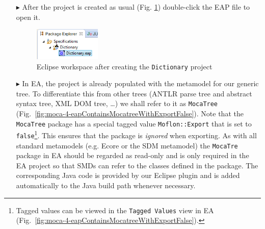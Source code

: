 \begin{enumerate}
\clearpage

\item[$\blacktriangleright$] After the project is created as usual (Fig. \ref{fig:moca-3-WizardResult}) double-click the EAP file to open it.

\begin{figure}[!htbp]
\begin{center}
 \includegraphics[width=0.3\textwidth]{pics/moca/1DictionaryMetaModel/3-WizardResult}
  \caption{Eclipse workspace after creating the \texttt{Dictionary} project}
  \label{fig:moca-3-WizardResult}
\end{center}
\end{figure}

\item[$\blacktriangleright$] In EA, the project is already populated with the metamodel for our generic tree.
To differentiate this from other trees (ANTLR parse tree and abstract syntax tree, XML DOM tree, \ldots) we shall refer to it as \texttt{MocaTree} (Fig.~\ref{fig:moca-4-eapContainsMocatreeWithExportFalse}).
Note that the \texttt{MocaTree} package has a special tagged value \texttt{Moflon::Export} that is set to \texttt{false}\footnote{Tagged values can be viewed in the \texttt{Tagged Values} view in EA (Fig.~\ref{fig:moca-4-eapContainsMocatreeWithExportFalse}).}.
This ensures that the package is \emph{ignored} when exporting.
As with all standard metamodels (e.g. Ecore or the SDM metamodel) the \texttt{MocaTre} package in EA should be regarded as read-only and is only required in the EA project so that SMDs can refer to the classes defined in the package.
The corresponding Java code is provided by our Eclipse plugin and is added automatically to the Java build path whenever necessary.


\end{enumerate}
